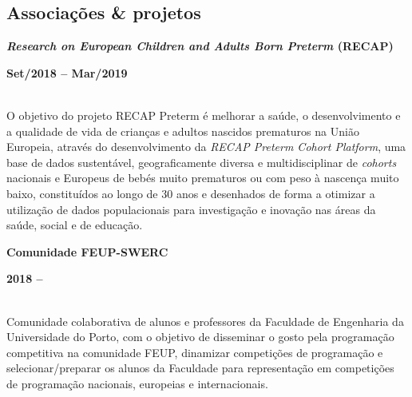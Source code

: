 \documentclass[8pt]{extarticle}
\newcommand{\parag}[1]{
\begin{minipage}{\textwidth} \hfill
\begin{minipage}{\dimexpr\textwidth-0.6cm}
	#1
\end{minipage}
\end{minipage}
}
\newcommand{\itemtime}[2]{
#1 \hfill \begin{minipage}[t]{0.185\textwidth}         #2  \end{minipage}
}
\newcommand{\job}[3]{\parag{
\itemtime{\textbf{#1}}{\textbf{#2}}\\
#3 \vspace*{9px}}}
\begin{document}
\subsection*{Associações \& projetos}
\job{\textit{Research on European Children and Adults Born Preterm} (RECAP)}{Set/2018 – Mar/2019}{
O objetivo do projeto RECAP Preterm é melhorar a saúde, o desenvolvimento e a qualidade de vida de crianças e adultos nascidos prematuros na União Europeia, através do desenvolvimento da \textit{RECAP Preterm Cohort Platform}, uma base de dados sustentável, geograficamente diversa e multidisciplinar de \textit{cohorts} nacionais e Europeus de bebés muito prematuros ou com peso à nascença muito baixo, constituídos ao longo de 30 anos e desenhados de forma a otimizar a utilização de dados populacionais para investigação e inovação nas áreas da saúde, social e de educação.
}
\job{Comunidade FEUP-SWERC}{2018 – }{
Comunidade colaborativa de alunos e professores da Faculdade de Engenharia da Universidade do Porto, com o objetivo de disseminar o gosto pela programação competitiva na comunidade FEUP, dinamizar competições de programação e selecionar/preparar os alunos da Faculdade para representação em competições de programação nacionais, europeias e internacionais.
}
\end{document}
